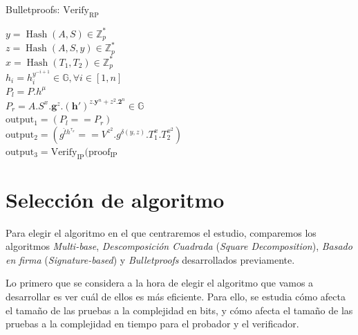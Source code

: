 \begin{minipage}{0.9\textwidth}
    \begin{algorithm}[H]
        \caption{Bulletproofs: $\operatorname{Verify_{RP}}$}
        $y = \operatorname{Hash}(A, S) \in \mathbb{Z}_{p}^{*}$ \\
        $z = \operatorname{Hash}(A, S, y) \in \mathbb{Z}_{p}^{*}$ \\
        $x = \operatorname{Hash}(T_{1}, T_{2}) \in \mathbb{Z}_{p}^{*}$ \\
        $h_{i} = h_{i}^{y^{-i+1}} \in \mathbb{G}, \forall i \in [1, n]$ \\
        $P_{l} = P.h^{\mu}$ \\
        $P_{r} = A.S^{x}.\mathbf{g}^{z}.(\mathbf{h}')^{z.\mathbf{y}^{n}+z^{2}.\mathbf{2}^{n}} \in \mathbb{G}$ \\
        $\operatorname{output_{1}} = (P_{l} == P_{r})$ \\
        $\operatorname{output_{2}} = (g^{\hat{t}h^{\tau_{x}}} == V^{z^{2}}.g^{\delta(y, z)}.T_{1}^{x}.T_{2}^{x^{2}})$ \\
        $\operatorname{output_{3}} = \operatorname{Verify_{IP}}(\operatorname{proof_{IP}}$ \\
    \end{algorithm}
\end{minipage}

\section{Selección de algoritmo} \label{sec:seleccion}

Para elegir el algoritmo en el que centraremos el estudio, comparemos los algoritmos \emph{Multi-base}, \emph{Descomposición Cuadrada} (\emph{Square Decomposition}), \emph{Basado en firma} (\emph{Signature-based}) y \emph{Bulletproofs} desarrollados previamente.

Lo primero que se considera a la hora de elegir el algoritmo que vamos a desarrollar es ver cuál de ellos es más eficiente. Para ello, se estudia cómo afecta el tamaño de las pruebas a la complejidad en bits, y cómo afecta el tamaño de las pruebas a la complejidad en tiempo para el probador y el verificador.

